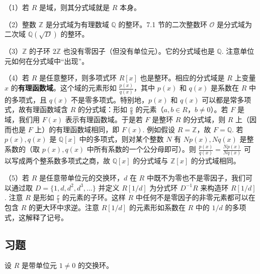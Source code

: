 \begin{example}
（1）若 \(R\) 是域，则其分式域就是 \(R\) 本身。

（2）整数 \(\mathbb{Z}\) 是分式域为有理数域 \(\mathbb{Q}\) 的整环。7.1 节的二次整数环 \(\mathcal{O}\) 是分式域为二次域 \(\mathbb{Q}(\sqrt{D})\) 的整环。

（3）\(\mathbb{Z}\) 的子环 \(2\mathbb{Z}\) 也没有零因子（但没有单位元）。它的分式域也是 \(\mathbb{Q}\). 注意单位元如何在分式域中“出现”。

（4）若 \(R\) 是任意整环，则多项式环 \(R[x]\) 也是整环。相应的分式域是 \(R\) 上变量 \(x\) 的\textbf{有理函数域}。这个域的元素形如 \(\frac{p(x)}{q(x)}\)，其中 \(p(x)\) 和 \(q(x)\) 是系数在 \(R\) 中的多项式，且 \(q(x)\) 不是零多项式。特别地，\(p(x)\) 和 \(q(x)\) 可以都是常多项式，故有理函数域含 \(R\) 的分式域：形如 \(\frac{a}{b}\) 的元素（\(a, b \in R\)，\(b \neq 0\)）。若 \(F\) 是域，我们用 \(F(x)\) 表示有理函数域。于是若 \(F\) 是整环 \(R\) 的分式域，则 \(R\) 上（因而也是 \(F\) 上）的有理函数域相同，即 \(F(x)\). 例如假设 \(R = \mathbb{Z}\)，故 \(F = \mathbb{Q}\). 若 \(p(x), q(x)\) 是 \(\mathbb{Q}[x]\) 中的多项式，则对某个整数 \(N\) 有 \(Np(x), Nq(x)\) 是整系数的（取 \(p(x), q(x)\) 中所有系数的一个公分母即可）。则 \(\frac{p(x)}{q(x)} = \frac{Np(x)}{Nq(x)}\) 可以写成两个整系数多项式之商，故 \(\mathbb{Q}[x]\) 的分式域与 \(\mathbb{Z}[x]\) 的分式域相同。

（5）若 \(R\) 是任意带单位元的交换环，\(d\) 在 \(R\) 中既不为零也不是零因子，我们可以通过取 \(D = \{1, d, d^2, d^3, \ldots\}\) 并定义 \(R[1/d]\) 为分式环 \(D^{-1}R\) 来构造环 \(R[1/d]\). 注意 \(R\) 是形如 \(\frac{r}{1}\) 的元素的子环。这样 \(R\) 中任何不是零因子的非零元素都可以在包含 \(R\) 的更大环中求逆。注意 \(R[1/d]\) 的元素形如系数在 \(R\) 中的 \(1/d\) 的多项式，这解释了记号。
\end{example}

\subsection*{习题}
设 \(R\) 是带单位元 \(1 \neq 0\) 的交换环。


